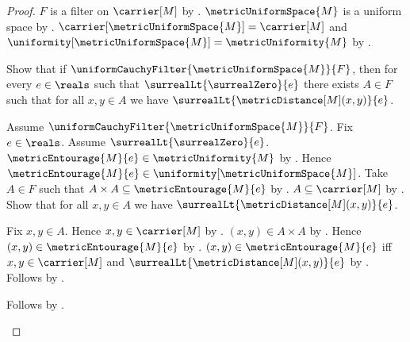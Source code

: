 \begin{proof}
    $F$ is a filter on $\carrier[M]$ by
        .
    $\metricUniformSpace{M}$ is a uniform space by
        .
    $\carrier[\metricUniformSpace{M}]=\carrier[M]$ and
        $\uniformity[\metricUniformSpace{M}]=\metricUniformity{M}$ by
        .

    Show that if $\uniformCauchyFilter{\metricUniformSpace{M}}{F}$,
        then for every $e\in\reals$ such that
        $\surrealLt{\surrealZero}{e}$ there exists $A\in F$ such that
        for all $x,y\in A$ we have
            $\surrealLt{\metricDistance[M](x,y)}{e}$.
    \begin{subproof}
        Assume $\uniformCauchyFilter{\metricUniformSpace{M}}{F}$.
        Fix $e\in\reals$.
        Assume $\surrealLt{\surrealZero}{e}$.
        $\metricEntourage{M}{e}\in\metricUniformity{M}$ by
            .
        Hence $\metricEntourage{M}{e}\in
            \uniformity[\metricUniformSpace{M}]$.
        Take $A\in F$ such that
            $A\times A\subseteq\metricEntourage{M}{e}$ by
            .
        $A\subseteq\carrier[M]$ by .
        Show that for all $x,y\in A$ we have
            $\surrealLt{\metricDistance[M](x,y)}{e}$.
        \begin{subproof}
            Fix $x,y\in A$.
            Hence $x,y\in\carrier[M]$ by .
            $(x,y)\in A\times A$ by .
            Hence $(x,y)\in\metricEntourage{M}{e}$ by .
            $(x,y)\in\metricEntourage{M}{e}$ iff
                $x,y\in\carrier[M]$ and
                $\surrealLt{\metricDistance[M](x,y)}{e}$ by
                .
            Follows by \auto.
        \end{subproof}
        Follows by \auto.
    \end{subproof}


\end{proof}
